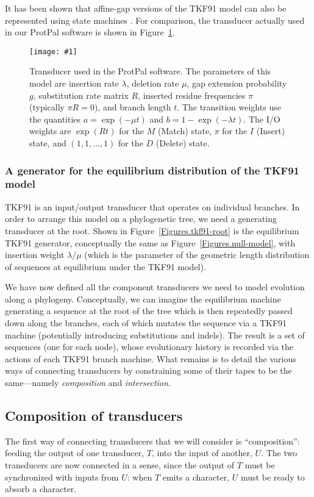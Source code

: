 \documentclass{article}
\newcommand{\seclabel}[1]{\label{sec.#1}}
\newcommand{\figref}[1]{Figure~\ref{Figures.#1}}
\newcommand{\figlabel}[1]{\label{Figures.#1}}
\newcommand{\easyfig}[4]{
\begin{figure}
\texttt{[image: \#1]}
\caption{ \figlabel{#3} #4}
\end{figure}}
\newcommand{\pdffig}[2]{\easyfig{#1-fig.pdf}{}{#1}{#2}}
\begin{document}
It has been shown that affine-gap versions of the TKF91 model can also be represented using state machines \cite{MiklosLunterHolmes2004}.
For comparison, the transducer actually used in our ProtPal software is shown in \figref{protpal}.

\pdffig{protpal}{Transducer used in the ProtPal software.
The parameters of this model are insertion rate $\lambda$, deletion rate $\mu$, gap extension probability $g$,
substitution rate matrix $R$, inserted residue frequencies $\pi$ (typically $\pi R = 0$), and branch length $t$.
The transition weights use the quantities
$a = \exp(-\mu t)$ and $b = 1 - \exp(-\lambda t)$.
The I/O weights are $\exp(Rt)$ for the $M$ (Match) state,
$\pi$ for the $I$ (Insert) state,
and $(1,1,\ldots,1)$ for the $D$ (Delete) state.
}

\subsubsection{A generator for the equilibrium distribution of the TKF91 model} TKF91 is an input/output transducer that
operates on individual branches.  In order to arrange this model on a phylogenetic tree,
we need a generating transducer at the root.  
Shown in \figref{tkf91-root} is the equilibrium TKF91 generator, conceptually the same as
\figref{null-model}, with insertion weight $\lambda/\mu$
(which is the parameter of the geometric length distribution of sequences at equilibrium under the TKF91 model).

We have now defined all the component transducers we need to model evolution along a phylogeny. 
Conceptually, we can imagine the equilibrium machine generating a sequence at the root of the
tree which is then repeatedly passed down along the branches, each of which mutates the sequence
via a TKF91 machine (potentially introducing substitutions and indels). 
The result is a set of sequences (one  for each node),
  whose evolutionary history is recorded via  
the actions of each TKF91  branch machine.  
What remains is to detail the various ways of connecting transducers by
 constraining some of their tapes to be the same---namely {\em composition} and {\em intersection}.

\subsection{Composition of transducers}
\seclabel{Tutorial.Composition}
The first way of connecting transducers that we will consider is  ``composition'':
feeding the output of one transducer, $T$, into the input of another, $U$.
The two transducers are now connected in a sense, since the output of $T$ must be
 synchronized with inputs from $U$: when $T$ emits a character, $U$ must be ready to absorb a character.  
\end{document}
